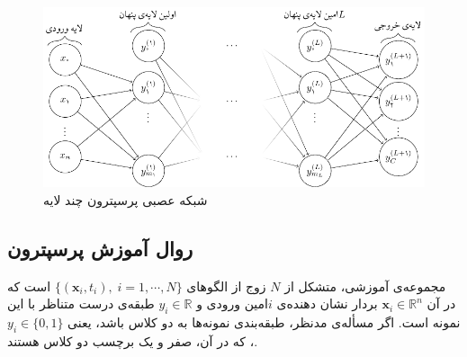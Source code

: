 \documentclass[11pt, twoside]{imsproc}
\begin{document}

\begin{figure}[t]
    \centering
        \centering
			\includegraphics[width=.8\linewidth]{images/MLP}
			\caption{شبکه عصبی پرسپترون چند لایه}
			\label{fig:MLP}
\end{figure}
\subsection{روال آموزش پرسپترون}\label{sec:learning}
مجموعه‌ی آموزشی، متشکل از
$N$
زوج از الگوهای
$\{ ({\mathbf{x}}_i,{t}_i),\;i=1,\cdots,N\}$
است که در آن
$\mathbf{x}_i\in \mathbb{R}^n$
بردار نشان دهنده‌ی $i$امین ورودی و
$y_i\in \mathbb{R}$
طبقه‌ی درست متناظر با این نمونه است.
 اگر مسأله‌ی مدنظر، طبقه‌بندی نمونه‌ها به دو کلاس باشد، يعنی 
$y_i\in\{0,1\}$،
که در آن، صفر و یک برچسب دو کلاس هستند. %
\end{document}
